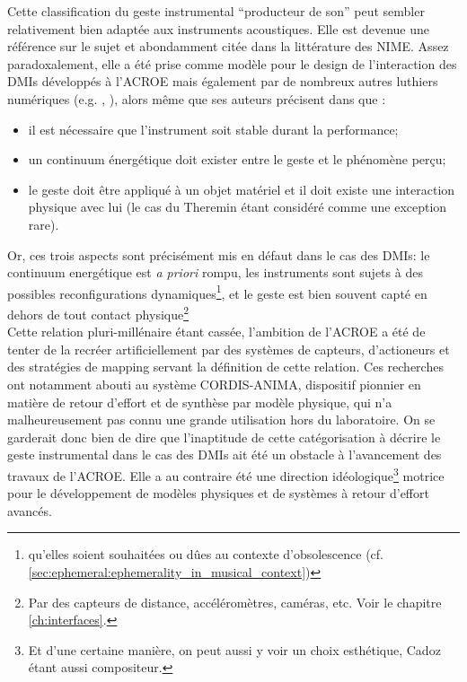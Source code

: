 \noindent Cette classification du geste instrumental ``producteur de son'' peut sembler relativement bien adaptée aux instruments acoustiques. Elle est devenue une référence sur le sujet et abondamment citée dans la littérature des \gls{NIME}. Assez paradoxalement, elle a été prise comme modèle pour le design de l'interaction des \glspl{DMI} développés à l'\gls{ACROE} mais également par de nombreux autres luthiers numériques (e.g. \cite{arfib_strategies_2002}, \cite{schwarz_sound_2012}), alors même que ses auteurs précisent dans \cite{cadoz_geste_1994, cadoz_gesture_2000} que :
\vspace{-1em}
	\begin{itemize}[noitemsep]
		\item il est nécessaire que l'instrument soit stable durant la performance;
		\item un continuum énergétique doit exister entre le geste et le phénomène perçu;
		\item le geste doit être appliqué à un objet matériel et il doit existe une interaction physique avec lui (le cas du Theremin étant considéré comme une exception rare).	
\end{itemize}
\noindent Or, ces trois aspects sont précisément mis en défaut dans le cas des \glspl{DMI}: le continuum energétique est \textit{a priori} rompu, les instruments sont sujets à des possibles reconfigurations dynamiques\footnote{qu'elles soient souhaitées ou dûes au contexte d'obsolescence (cf. \ref{sec:ephemeral:ephemerality_in_musical_context})}, et le geste est bien souvent capté en dehors de tout contact physique\footnote{Par des capteurs de distance, accéléromètres, caméras, etc. Voir le chapitre \ref{ch:interfaces}.}\\
\indent Cette relation pluri-millénaire étant cassée, l'ambition de l'\gls{ACROE} a été de tenter de la recréer artificiellement par des systèmes de capteurs, d'actioneurs et des stratégies de mapping servant la définition de cette relation. Ces recherches ont notamment abouti au système \gls{CORDIS-ANIMA}, dispositif pionnier en matière de retour d'effort et de synthèse par modèle physique, qui n'a malheureusement pas connu une grande utilisation hors du laboratoire. On se garderait donc bien de dire que l'inaptitude de cette catégorisation à décrire le geste instrumental dans le cas des \glspl{DMI} ait été un obstacle à l'avancement des travaux de l'\gls{ACROE}. Elle a au contraire été une direction idéologique\footnote{Et d'une certaine manière, on peut aussi y voir un choix esthétique, Cadoz étant aussi compositeur.} motrice pour le développement de modèles physiques et de systèmes à retour d'effort avancés.\\
